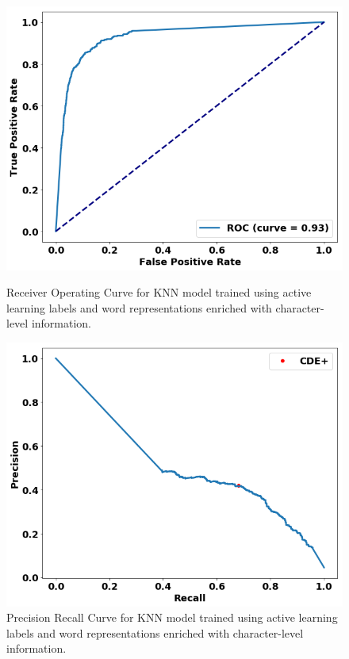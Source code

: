 \begin{figure}
\centering
\begin{minipage}[b]{.4\textwidth}
\includegraphics[trim=0in 0.1in 0.1in 0.in,clip,width=1.0\textwidth]{figures/fasttext_roc_al_corpus_round5_100}
\caption{Receiver Operating Curve for KNN model trained using active learning labels and word representations enriched with character-level information.}\label{fig:al1_rocs_fasttext}
\end{minipage}\qquad
\begin{minipage}[b]{.4\textwidth}
\includegraphics[trim=0in 0.1in 0.1in 0.in,clip,width=1.0\textwidth]{figures/fasttext_prc_al_corpus_round5_100}
\caption{Precision Recall Curve for KNN model trained using active learning labels and word representations enriched with character-level information.}\label{fig:al1_prcs_fasttext}
\end{minipage}
\end{figure}











